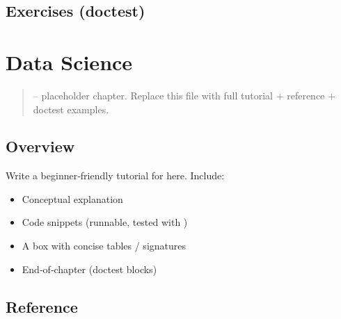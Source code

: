 \documentclass[a4paper,11pt,english]{sphinxmanual}
\begin{document}
\subsection{Exercises (doctest)}
\label{\detokenize{third_party/cli_tools:exercises-doctest}}
\begin{sphinxVerbatim}[commandchars=\\\{\}]
\end{sphinxVerbatim}

\sphinxstepscope


\section{Data Science}
\label{\detokenize{third_party/data_science:data-science}}\label{\detokenize{third_party/data_science::doc}}\begin{quote}

\sphinxAtStartPar
{} – placeholder chapter. Replace this file with full tutorial + reference + doctest examples.
\end{quote}


\subsection{Overview}
\label{\detokenize{third_party/data_science:overview}}
\sphinxAtStartPar
Write a beginner‑friendly tutorial for  here. Include:
\begin{itemize}
\item {} 
\sphinxAtStartPar
Conceptual explanation

\item {} 
\sphinxAtStartPar
Code snippets (runnable, tested with )

\item {} 
\sphinxAtStartPar
A  box with concise tables / signatures

\item {} 
\sphinxAtStartPar
End‑of‑chapter  (doctest blocks)

\end{itemize}


\subsection{Reference}
\label{\detokenize{third_party/data_science:reference}}
\end{document}
